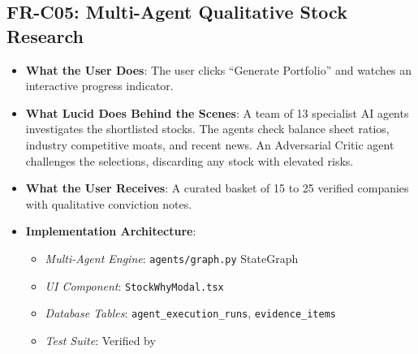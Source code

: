 \subsection{FR-C05: Multi-Agent Qualitative Stock Research}
\begin{itemize}
    \item \textbf{What the User Does}: The user clicks ``Generate Portfolio'' and watches an interactive progress indicator.
    \item \textbf{What Lucid Does Behind the Scenes}: A team of 13 specialist AI agents investigates the shortlisted stocks. The agents check balance sheet ratios, industry competitive moats, and recent news. An Adversarial Critic agent challenges the selections, discarding any stock with elevated risks.
    \item \textbf{What the User Receives}: A curated basket of 15 to 25 verified companies with qualitative conviction notes.
    \item \textbf{Implementation Architecture}:
    \begin{itemize}
        \item \textit{Multi-Agent Engine}: \texttt{agents/graph.py} StateGraph
        \item \textit{UI Component}: \texttt{StockWhyModal.tsx}
        \item \textit{Database Tables}: \texttt{agent\_execution\_runs}, \texttt{evidence\_items}
        \item \textit{Test Suite}: Verified by 
    \end{itemize}
\end{itemize}

